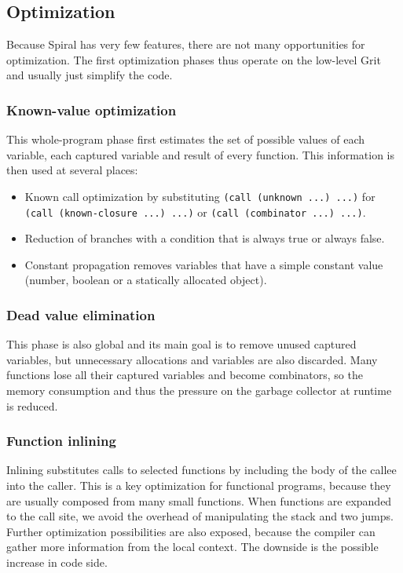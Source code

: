 \subsection{Optimization}

Because Spiral has very few features, there are not many opportunities for
optimization. The first optimization phases thus operate on the low-level Grit
and usually just simplify the code.

\subsubsection{Known-value optimization}

This whole-program phase first estimates the set of possible values of each
variable, each captured variable and result of every function. This information
is then used at several places:

\begin{itemize}
  \item Known call optimization by substituting \texttt{(call (unknown ...)
    ...)} for \texttt{(call (known-closure ...) ...)} or \texttt{(call
    (combinator ...) ...)}.
  \item Reduction of branches with a condition that is always true or
    always false.
  \item Constant propagation removes variables that have a simple constant value
    (number, boolean or a statically allocated object).
\end{itemize}

\subsubsection{Dead value elimination}

This phase is also global and its main goal is to remove unused captured
variables, but unnecessary allocations and variables are also discarded. Many
functions lose all their captured variables and become combinators, so
the memory consumption and thus the pressure on the garbage collector at runtime is
reduced.

\subsubsection{Function inlining}

Inlining substitutes calls to selected functions by including the body of the
callee into the caller. This is a key optimization for functional programs,
because they are usually composed from many small functions. When functions are
expanded to the call site, we avoid the overhead of manipulating the stack and
two jumps. Further optimization possibilities are also exposed, because the
compiler can gather more information from the local context. The downside is the
possible increase in code side.

